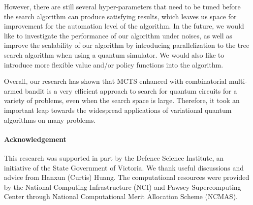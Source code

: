 \documentclass{ieeeaccess}
\begin{document}
However, there are still several hyper-parameters that need to be tuned before the search algorithm can produce satisfying results, which leaves us space for improvement for the automation level of the algorithm. In the future, we would like to investigate the performance of our algorithm under noises, as well as improve the scalability of our algorithm by introducing parallelization to the tree search algorithm when using a quantum simulator. We would also like to introduce more flexible value and/or policy functions into the algorithm.

Overall, our research has shown that MCTS enhanced with combinatorial multi-armed bandit is a very efficient approach to search for quantum circuits for a variety of problems, even when the search space is large. Therefore, it took an important leap towards the widespread applications of variational quantum algorithms on many problems.

\paragraph{Acknowledgement} This research was supported in part by the Defence Science Institute, an initiative of the State Government of Victoria. We thank useful discussions and advice from Hanxun (Curtis) Huang. The computational resources were provided by the National Computing Infrastructure (NCI) and Pawsey Supercomputing Center through National Computational Merit Allocation Scheme (NCMAS).

















\newpage

\typeout{} 




\EOD
\end{document}
